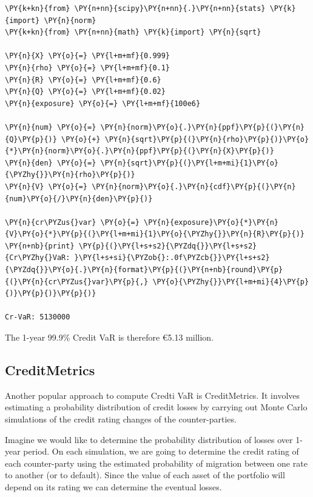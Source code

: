 \begin{tcolorbox}[breakable, size=fbox, boxrule=1pt, pad at break*=1mm,colback=cellbackground, colframe=cellborder]
\begin{Verbatim}[commandchars=\\\{\}]
\PY{k+kn}{from} \PY{n+nn}{scipy}\PY{n+nn}{.}\PY{n+nn}{stats} \PY{k}{import} \PY{n}{norm}
\PY{k+kn}{from} \PY{n+nn}{math} \PY{k}{import} \PY{n}{sqrt}
		
\PY{n}{X} \PY{o}{=} \PY{l+m+mf}{0.999}
\PY{n}{rho} \PY{o}{=} \PY{l+m+mf}{0.1}
\PY{n}{R} \PY{o}{=} \PY{l+m+mf}{0.6}
\PY{n}{Q} \PY{o}{=} \PY{l+m+mf}{0.02}
\PY{n}{exposure} \PY{o}{=} \PY{l+m+mf}{100e6}
		
\PY{n}{num} \PY{o}{=} \PY{n}{norm}\PY{o}{.}\PY{n}{ppf}\PY{p}{(}\PY{n}{Q}\PY{p}{)} \PY{o}{+} \PY{n}{sqrt}\PY{p}{(}\PY{n}{rho}\PY{p}{)}\PY{o}{*}\PY{n}{norm}\PY{o}{.}\PY{n}{ppf}\PY{p}{(}\PY{n}{X}\PY{p}{)}
\PY{n}{den} \PY{o}{=} \PY{n}{sqrt}\PY{p}{(}\PY{l+m+mi}{1}\PY{o}{\PYZhy{}}\PY{n}{rho}\PY{p}{)}
\PY{n}{V} \PY{o}{=} \PY{n}{norm}\PY{o}{.}\PY{n}{cdf}\PY{p}{(}\PY{n}{num}\PY{o}{/}\PY{n}{den}\PY{p}{)}
		
\PY{n}{cr\PYZus{}var} \PY{o}{=} \PY{n}{exposure}\PY{o}{*}\PY{n}{V}\PY{o}{*}\PY{p}{(}\PY{l+m+mi}{1}\PY{o}{\PYZhy{}}\PY{n}{R}\PY{p}{)}
\PY{n+nb}{print} \PY{p}{(}\PY{l+s+s2}{\PYZdq{}}\PY{l+s+s2}{Cr\PYZhy{}VaR: }\PY{l+s+si}{\PYZob{}:.0f\PYZcb{}}\PY{l+s+s2}{\PYZdq{}}\PY{o}{.}\PY{n}{format}\PY{p}{(}\PY{n+nb}{round}\PY{p}{(}\PY{n}{cr\PYZus{}var}\PY{p}{,} \PY{o}{\PYZhy{}}\PY{l+m+mi}{4}\PY{p}{)}\PY{p}{)}\PY{p}{)}

Cr-VaR: 5130000
\end{Verbatim}
\end{tcolorbox}
The 1-year 99.9\% Credit VaR is therefore \euro{5.13} million.

\subsection{CreditMetrics}
Another popular approach to compute Credti VaR is CreditMetrics. It involves estimating a probability distribution of credit losses by carrying out Monte Carlo simulations of the credit rating changes of the  counter-parties.

Imagine we would like to determine the probability distribution of losses over 1-year period. On each simulation, we are going to determine the credit rating of each counter-party using the estimated probability of migration between one rate to another (or to default). Since the value of each asset of the portfolio will depend on its rating we can determine the eventual losses. 

